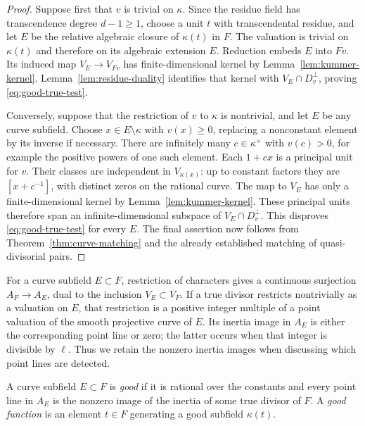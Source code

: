 \begin{proof}
Suppose first that $v$ is trivial on $\kappa$.  Since the residue field
has transcendence degree $d-1\ge1$, choose a unit $t$ with transcendental
residue, and let $E$ be the relative algebraic closure of $\kappa(t)$
in $F$.  The valuation is trivial on $\kappa(t)$ and therefore on its
algebraic extension $E$.  Reduction embeds $E$ into $Fv$.  Its induced
map $V_E\to V_{Fv}$ has finite-dimensional kernel by
Lemma~\ref{lem:kummer-kernel}.  Lemma~\ref{lem:residue-duality} identifies
that kernel with $V_E\cap D_v^\perp$, proving
\eqref{eq:good-true-test}.

Conversely, suppose that the restriction of $v$ to $\kappa$ is nontrivial,
and let $E$ be any curve subfield.  Choose $x\in E\setminus\kappa$ with
$v(x)\ge0$, replacing a nonconstant element by its inverse if necessary.
There are infinitely many $c\in\kappa^\times$ with $v(c)>0$, for
example the positive powers of one such element.  Each $1+cx$ is a
principal unit for $v$.  Their classes are independent in
$V_{\kappa(x)}$: up to constant factors they are $[x+c^{-1}]$, with
distinct zeros on the rational curve.  The map to $V_E$ has only a
finite-dimensional kernel by Lemma~\ref{lem:kummer-kernel}.  These
principal units therefore span an infinite-dimensional subspace of
$V_E\cap D_v^\perp$.  This disproves \eqref{eq:good-true-test} for every
$E$.  The final assertion now follows from
Theorem~\ref{thm:curve-matching} and the already established matching of
quasi-divisorial pairs.
\end{proof}

For a curve subfield $E\subset F$, restriction of characters gives a
continuous surjection $A_F\to A_E$, dual to the inclusion $V_E\subset V_F$.
If a true divisor restricts nontrivially as a valuation on $E$, that
restriction is a positive integer multiple of a point valuation of the
smooth projective curve of $E$.  Its inertia image in $A_E$ is either
the corresponding point line or zero; the latter occurs when that
integer is divisible by $\ell$.  Thus we retain the nonzero inertia
images when discussing which point lines are detected.

\begin{definition}
\label{def:good-subfield}
A curve subfield $E\subset F$ is \emph{good} if it is rational over
the constants and every point line in $A_E$ is the nonzero image of the
inertia of some true divisor of $F$.  A \emph{good function} is an element
$t\in F$ generating a good subfield $\kappa(t)$.
\end{definition}

